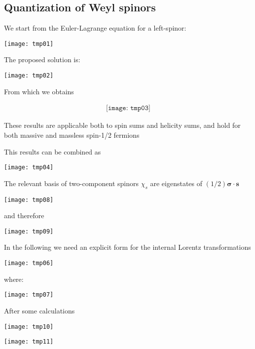 \subsection{Quantization of Weyl spinors}
\begin{frame}

We start from the Euler-Lagrange equation for a left-spinor:

\texttt{[image: tmp01]} 

The proposed solution is:

\texttt{[image: tmp02]} 

From which we obtains 

\begin{align}
  \texttt{[image: tmp03]} 
\end{align}

These results are applicable both to spin sums and helicity sums, and hold for both massive and massless spin-1/2 fermions

\end{frame}

This results can be combined as 

\texttt{[image: tmp04]}

The relevant basis of two-component spinors $\chi_s$ are eigenstates of $(1/2)\boldsymbol{\sigma}\cdot \boldsymbol{s}$

\texttt{[image: tmp08]}  

and therefore

\texttt{[image: tmp09]}  



In the following we need an explicit form for the internal Lorentz transformations

\texttt{[image: tmp06]} 

where:

\texttt{[image: tmp07]} 

After some calculations 

\texttt{[image: tmp10]} 

\texttt{[image: tmp11]} 


